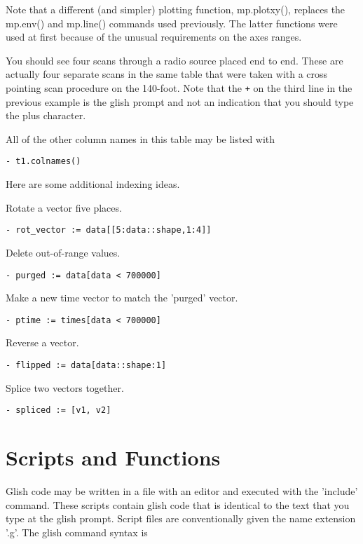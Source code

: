 Note that a different (and simpler) plotting function, mp.plotxy(), replaces
the mp.env() and mp.line() commands used previously.  The latter functions
were used at first because of the unusual requirements on the axes ranges.

You should see four scans through a radio source placed end to end.  These
are actually four separate scans in the same table that were taken with a
cross pointing scan procedure on the 140-foot.  Note that the \verb!+!
on the third line in the previous example is the glish prompt
and not an indication that you should type the plus character.

    All of the other column names in this table may be listed with

\begin{verbatim}
- t1.colnames()
\end{verbatim}

    Here are some additional indexing ideas.

Rotate a vector five places.

\begin{verbatim}
- rot_vector := data[[5:data::shape,1:4]]
\end{verbatim}

Delete out-of-range values.

\begin{verbatim}
- purged := data[data < 700000]
\end{verbatim}

Make a new time vector to match the 'purged' vector.

\begin{verbatim}
- ptime := times[data < 700000]
\end{verbatim}

Reverse a vector.

\begin{verbatim}
- flipped := data[data::shape:1]
\end{verbatim}

Splice two vectors together.

\begin{verbatim}
- spliced := [v1, v2]
\end{verbatim}

\section{Scripts and Functions}

    Glish code may be written in a file with an editor and executed with
the 'include' command.  These scripts contain glish code that is identical
to the text that you type at the glish prompt.  Script files are
conventionally given the name extension '.g'.  The glish command syntax is


